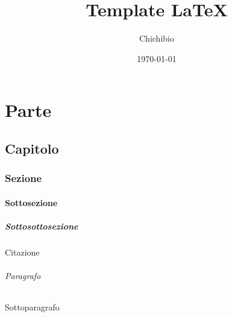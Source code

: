 \documentclass[12pt]{scrreprt}
\title{Template \LaTeX}
\author{Chichibio}
\date{\today}
\begin{document}
	
	\begin{titlepage}
		\maketitle
	\end{titlepage}
	
	\tableofcontents
	
	\part{Parte}
	\chapter{Capitolo}
	\section{Sezione}
	\subsection{Sottosezione}
	\subsubsection{Sottosottosezione}
	Citazione \cite{IuriTex}

	\paragraph{Paragrafo}
	\subparagraph{Sottoparagrafo}
	
	
	
\end{document}
